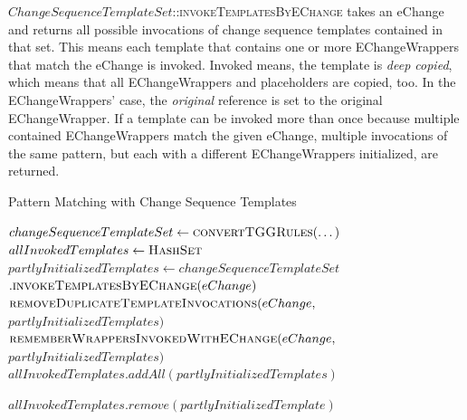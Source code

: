 $ChangeSequenceTemplateSet$::\textsc{invokeTemplatesByEChange} takes an eChange and returns all possible invocations of change sequence templates contained in that set.
This means each template that contains one or more EChangeWrappers that match the eChange is invoked. 
Invoked means, the template is \emph{deep copied}, which means that all EChangeWrappers and placeholders are copied, too. In the EChangeWrappers' case, the \emph{original} reference is set to the original EChangeWrapper.
If a template can be invoked more than once because multiple contained EChangeWrappers match the given eChange, multiple invocations of the same pattern, but each with a different EChangeWrappers initialized, are returned.


\begin{algorithm}
    \caption{Pattern Matching with Change Sequence Templates}
    \label{alg:BackwardConversionPM:GreenPatternMatchingMain}
    \begin{algorithmic}
        \State $changeSequenceTemplateSet \gets \Call{convertTGGRules}{\dots}$
        \State $allInvokedTemplates \gets \Call{HashSet}{}$
                \State $partlyInitializedTemplates \gets changeSequenceTemplateSet$
                \State \hspace{1.2cm} $.\Call{invokeTemplatesByEChange}{eChange}$
                \State $\Call{removeDuplicateTemplateInvocations}{}(eChange,$
                \State \hspace{5.2cm} $partlyInitializedTemplates)$
                \State $\Call{rememberWrappersInvokedWithEChange}{}(eChange,$
                \State \hspace{5.2cm} $partlyInitializedTemplates)$
                \State $allInvokedTemplates.addAll(partlyInitializedTemplates)$

                        \State $allInvokedTemplates.remove(partlyInitializedTemplate)$
                    \EndIf
                \EndFor 
            \EndFor 
        \EndFunction
        \newline


\end{algorithmic}
\end{algorithm}

